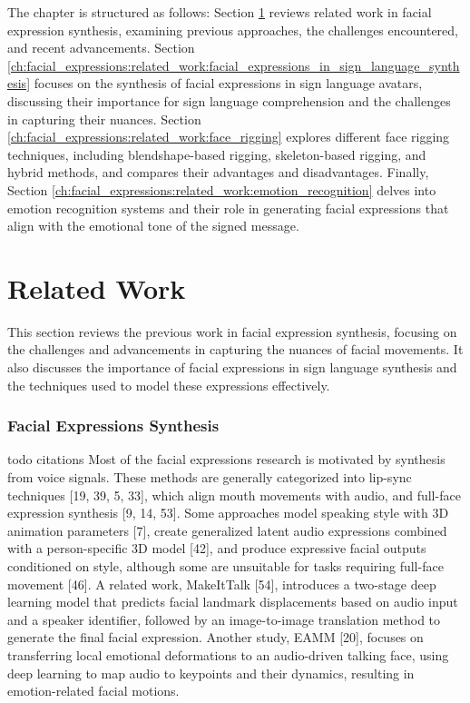 \documentclass[../../main.tex]{subfiles}
\begin{document}
The chapter is structured as follows: Section \ref{ch:facial_expressions:related_work} reviews related work in facial expression synthesis, examining previous approaches, the challenges encountered, and recent advancements. Section \ref{ch:facial_expressions:related_work:facial_expressions_in_sign_language_synthesis} focuses on the synthesis of facial expressions in sign language avatars, discussing their importance for sign language comprehension and the challenges in capturing their nuances. Section \ref{ch:facial_expressions:related_work:face_rigging} explores different face rigging techniques, including blendshape-based rigging, skeleton-based rigging, and hybrid methods, and compares their advantages and disadvantages. Finally, Section \ref{ch:facial_expressions:related_work:emotion_recognition} delves into emotion recognition systems and their role in generating facial expressions that align with the emotional tone of the signed message.

\section{Related Work}
\label{ch:facial_expressions:related_work}

This section reviews the previous work in facial expression synthesis, focusing on the challenges and advancements in capturing the nuances of facial movements. It also discusses the importance of facial expressions in sign language synthesis and the techniques used to model these expressions effectively.

\subsubsection{Facial Expressions Synthesis}
\label{ch:facial_expressions:related_work:facial_expressions_synthesis}

todo citations
Most of the facial expressions research is motivated by synthesis from voice signals. These methods are generally categorized into lip-sync techniques [19, 39, 5, 33], which align mouth movements with audio, and full-face expression synthesis [9, 14, 53]. Some approaches model speaking style with 3D animation parameters [7], create generalized latent audio expressions combined with a person-specific 3D model [42], and produce expressive facial outputs conditioned on style, although some are unsuitable for tasks requiring full-face movement [46]. A related work, MakeItTalk [54], introduces a two-stage deep learning model that predicts facial landmark displacements based on audio input and a speaker identifier, followed by an image-to-image translation method to generate the final facial expression. Another study, EAMM [20], focuses on transferring local emotional deformations to an audio-driven talking face, using deep learning to map audio to keypoints and their dynamics, resulting in emotion-related facial motions.
\end{document}
